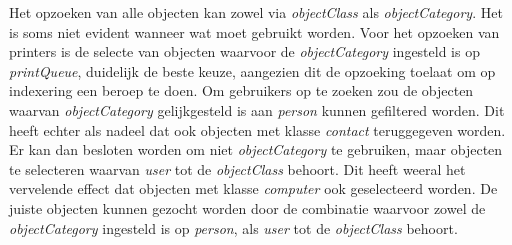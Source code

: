 \begin{enumerate}
{			Het opzoeken van alle objecten kan zowel via \textit{objectClass} als  \textit{objectCategory}. Het is soms niet evident wanneer wat moet gebruikt worden. Voor het opzoeken van printers is de selecte van objecten waarvoor de \textit{objectCategory} ingesteld is op \textit{printQueue}, duidelijk de beste keuze, aangezien dit de opzoeking toelaat om op indexering een beroep te doen. Om gebruikers op te zoeken zou de objecten waarvan \textit{objectCategory} gelijkgesteld is aan \textit{person} kunnen gefiltered worden. Dit heeft echter als nadeel dat ook objecten met klasse \textit{contact} teruggegeven worden. Er kan dan besloten worden om niet \textit{objectCategory} te gebruiken, maar objecten te selecteren waarvan \textit{user} tot de \textit{objectClass} behoort. Dit heeft weeral het vervelende effect dat objecten met klasse \textit{computer} ook geselecteerd worden. De juiste objecten kunnen gezocht worden door de combinatie waarvoor zowel de \textit{objectCategory} ingesteld is op \textit{person}, als \textit{user} tot de \textit{objectClass} behoort.
		}
	\end{enumerate}
	
